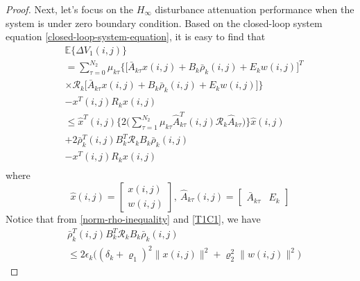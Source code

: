 \documentclass[journal,final,twocolumn]{IEEEtran}
\begin{document}
\begin{proof}
	Next, let's focus on the $H_{\infty}$  disturbance attenuation performance when the system is under zero boundary condition. Based on the closed-loop system equation \eqref{closed-loop-system-equation}, it is easy to find that
	\begin{equation}\label{DETAV1}
	\begin{split}
	&\mathbb{E}\{\varDelta V_{1}(i,j) \}\\
	&=  \sum_{\tau =0}^{N_{2}}\mu_{k\tau }\Big\{\big[\bar{A}_{k\tau }x(i,j)+B_{k}\bar{\rho}_{k}(i,j)+E_{k}w(i,j)\big]^{T}\\
	&\times \mathcal{R}_{k}\big[\bar{A}_{k\tau }x(i,j)+B_{k}\bar{\rho}_{k}(i,j)+E_{k}w(i,j)\big]\Big\}\\
	&- x^{T}(i,j)R_{k}x(i,j) \\
	&\leq \hat{x}^{T}(i,j) \Big\{2\big(\sum_{\tau =1}^{N_{2}}\mu_{k\tau }\hat{A}^{T}_{k\tau }(i,j)\mathcal{R}_{k}\hat{A}_{k\tau }\big)\Big\}\hat{x}(i,j)\\ &+2\bar{\rho}^{T}_{k}(i,j)B^{T}_{k}\mathcal{R}_{k}B_{k}\bar{\rho}_{k}(i,j) \\
	&-  x^{T}(i,j)R_{k}x(i,j)\\
	\end{split}
	\end{equation}
	where
	\begin{equation*}
		\hat{x}(i,j)=\begin{bmatrix}
		x(i,j)\\ w(i,j)
		\end{bmatrix},\ \hat{A}_{k\tau }(i,j)=\begin{bmatrix}
		\bar{A}_{k\tau }&E_{k}
		\end{bmatrix}
	\end{equation*}
	Notice that from \eqref{norm-rho-inequality} and \eqref{T1C1}, we have
	\begin{equation}\label{invRho}
		\begin{split}
		 	&\bar{\rho}^{T}_{k}(i,j)B^{T}_{k}\mathcal{R}_{k}B_{k}\bar{\rho}_{k}(i,j)\\
		 	&\leq 2\epsilon_{k}\big((\delta_{k}+\varrho_{1})^{2}\|x(i,j)\|^{2}+\varrho_{2}^{2}\|w(i,j)\|^{2} \big)
		\end{split}

\end{equation}
\end{proof}
\end{document}
